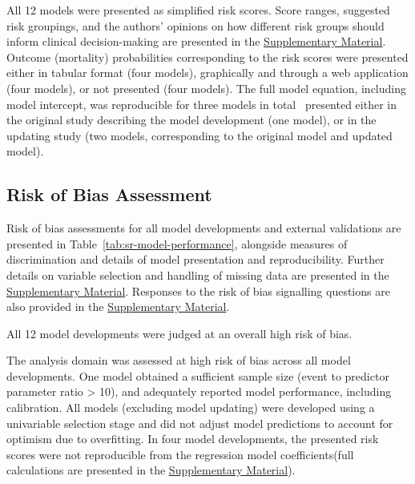 All 12 models were presented as simplified risk scores. Score ranges, suggested risk groupings, and the authors' opinions on how different risk groups should inform clinical decision-making are presented in the \href{https://github.com/jpwil/dphil}{Supplementary Material}. Outcome (mortality) probabilities corresponding to the risk scores were presented either in tabular format (four models)\cite{abongomeraDevelopmentExternalValidation2017,coura-vitalPrognosticFactorsScoring2014,kaminkClinicalSeverityScoring2017}, graphically and through a web application (four models)\cite{costaPredictingDeathKalaazar2016}, or not presented (four models)\cite{werneckPrognosticFactorsDeath2003,dearaujoEarlyClinicalManifestations2012,sampaioRiskFactorsDeath2010,foinquinosTemporalValidationPredictive2021}. The full model equation, including model intercept, was reproducible for three models in total \textemdash\ presented either in the original study describing the model development (one model)\cite{coura-vitalPrognosticFactorsScoring2014}, or in the updating study (two models, corresponding to the original model and updated model)\cite{foinquinosTemporalValidationPredictive2021}.

\subsection{Risk of Bias Assessment}

Risk of bias assessments for all model developments and external validations are presented in Table~\ref{tab:sr-model-performance}, alongside measures of discrimination and details of model presentation and reproducibility. Further details on variable selection and handling of missing data are presented in the \href{https://github.com/jpwil/dphil}{Supplementary Material}. Responses to the risk of bias signalling questions are also provided in the \href{https://github.com/jpwil/dphil}{Supplementary Material}.

All 12 model developments were judged at an overall high risk of bias.

The analysis domain was assessed at high risk of bias across all model developments. One model obtained a sufficient sample size (event to predictor parameter ratio > 10), and adequately reported model performance, including calibration\cite{coura-vitalPrognosticFactorsScoring2014}. All models (excluding model updating) were developed using a univariable selection stage and did not adjust model predictions to account for optimism due to overfitting. In four model developments, the presented risk scores were not reproducible from the regression model coefficients(full calculations are presented in the \href{https://github.com/jpwil/dphil}{Supplementary Material})\cite{costaPredictingDeathKalaazar2016}.

